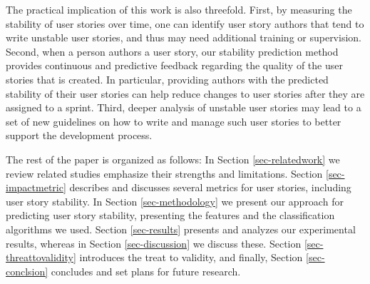 The practical implication of this work is also threefold. 
First, by measuring the stability of user stories over time, 
one can identify user story authors that tend to write unstable user stories, and thus may need additional training or supervision. 
Second, when a person authors a user story, our stability prediction method provides continuous and predictive feedback regarding the quality of the user stories that is created. 
In particular, providing authors with the predicted stability of their user stories can help reduce changes to user stories after they are assigned to a sprint. 
Third, deeper analysis of unstable user stories may lead to a set of new guidelines on how to write and manage such user stories to better support the development process.


 
The rest of the paper is organized as follows: %
In Section \ref{sec-relatedwork} we review related studies emphasize their strengths and limitations. Section \ref{sec-impactmetric} describes and discusses several metrics for user stories, including user story stability. 
In Section \ref{sec-methodology} we present our approach for predicting user story stability, presenting the 
features and the classification algorithms we used. %
Section \ref{sec-results} presents and analyzes our experimental results, whereas in Section \ref{sec-discussion} we discuss these. Section \ref{sec-threattovalidity} introduces the treat to validity, and finally, Section \ref{sec-conclsion} concludes and set plans for future research.


%
\label{sec-background}

